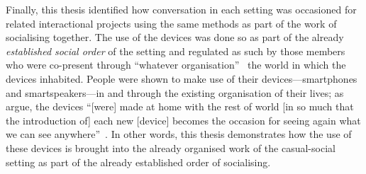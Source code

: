 \begin{corrections}
Finally, this thesis identified how conversation in each setting was occasioned for related interactional projects using the same methods as part of the work of socialising together.
The use of the devices was done so as part of the already \textit{established social order} of the setting and regulated as such by those members who were co-present through ﻿``whatever organisation''~\citep[pp. 548--549]{Sacks1992b} the world in which the devices inhabited.
People were shown to make use of their devices\----smartphones and smartspeakers---in and through the existing organisation of their lives; as \citet{Sacks1992b} argue, the devices ``[were] made at home with the rest of world [in so much that the introduction of] each new [device] becomes the occasion for seeing again what we can see anywhere''~\citep[pp. 548--549]{Sacks1992b}.
In other words, this thesis demonstrates how the use of these devices is brought into the already organised work of the casual-social setting as part of the already established order of socialising.
\end{corrections}




